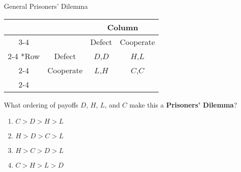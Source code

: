 
\begin{frame}{General Prisoners' Dilemma}
  \begin{table}[!h]
    \centering
    \begin{tabular}{*{4}{c|}}
      \multicolumn{2}{c}{} & \multicolumn{2}{c}{Column} \\ \cline{3-4}
      \multicolumn{1}{c}{} &         & Defect  & Cooperate \\ \cline{2-4}
      \multirow{2}*{Row} &    Defect & $D$,$D$ & $H$,$L$   \\ \cline{2-4}
                         & Cooperate & $L$,$H$ & $C$,$C$   \\ \cline{2-4} 
    \end{tabular} 
  \end{table} 

  What ordering of payoffs $D$, $H$, $L$, and $C$ make this a \textbf{Prisoners' Dilemma}? 
  \begin{enumerate}[label=\textbf{\alph*)}]
    \item $C > D > H > L$ 
    \item $H > D > C > L$ 
    \item $H > C > D > L$ 
    \item $C > H > L > D$
  \end{enumerate}
\end{frame}

